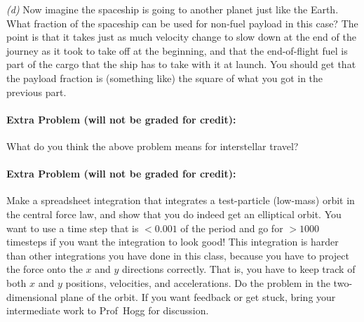 \documentclass[12pt]{article}
\begin{document}
\textsl{(d)} Now imagine the spaceship is going to another planet just
like the Earth. What fraction of the spaceship can be used for
non-fuel payload in this case? The point is that it takes just as much
velocity change to slow down at the end of the journey as it took to
take off at the beginning, and that the end-of-flight fuel is part of
the cargo that the ship has to take with it at launch. You should get
that the payload fraction is (something like) the square of what you got in
the previous part.

\paragraph{Extra Problem (will not be graded for credit):}%
What do you think the above problem means for interstellar travel?

\paragraph{Extra Problem (will not be graded for credit):}%
Make a spreadsheet integration that integrates a test-particle
(low-mass) orbit in the central force law, and show that you do indeed
get an elliptical orbit. You want to use a time step that is $<0.001$
of the period and go for $>1000$ timesteps if you want the integration
to look good! This integration is harder than other integrations you
have done in this class, because you have to project the force onto
the $x$ and $y$ directions correctly. That is, you have to keep track
of both $x$ and $y$ positions, velocities, and accelerations. Do the
problem in the two-dimensional plane of the orbit. If you want
feedback or get stuck, bring your intermediate work to Prof~Hogg for
discussion.
\end{document}
